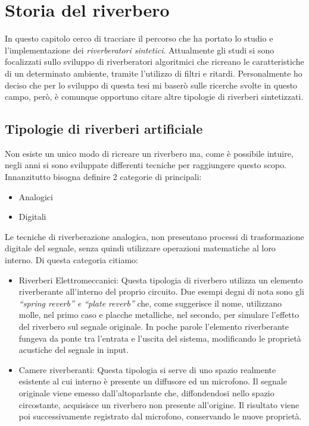 
\chapter{Storia del riverbero}
\label{chp:Storia del riverbero}

In questo capitolo cerco di tracciare il percorso che ha portato lo studio e l’implementazione dei \textit{riverberatori sintetici}. Attualmente gli studi si sono focalizzati sullo sviluppo di riverberatori algoritmici che ricreano le caratteristiche di un determinato ambiente, tramite l’utilizzo di filtri e ritardi. Personalmente ho deciso che per lo sviluppo di questa tesi mi baserò sulle ricerche svolte in questo campo, però, è comunque opportuno citare altre tipologie di riverberi sintetizzati.

\section{Tipologie di riverberi artificiale}

Non esiste un unico modo di ricreare un riverbero ma, come è possibile intuire, negli anni si sono sviluppate differenti tecniche per raggiungere questo scopo.
Innanzitutto bisogna definire 2 categorie di principali:

\begin{itemize}
\item Analogici
\item Digitali
\end{itemize}

Le tecniche di riverberazione analogica, non presentano processi di trasformazione digitale del segnale, senza quindi utilizzare operazioni matematiche al loro interno.
Di questa categoria citiamo:

\begin{itemize}
\item Riverberi Elettromeccanici: Questa tipologia di riverbero utilizza un elemento riverberante all’interno del proprio circuito. Due esempi degni di nota sono gli \emph{“spring reverb” e “plate reverb”} che, come suggerisce il nome, utilizzano molle, nel primo caso e placche metalliche, nel secondo, per simulare l’effetto del riverbero sul segnale originale. In poche parole l’elemento riverberante fungeva da ponte tra l’entrata e l’uscita del sistema, modificando le proprietà acustiche del segnale in input.
\item Camere riverberanti: Questa tipologia si serve di uno spazio realmente esistente al cui interno è presente un diffusore ed un microfono. Il segnale originale viene emesso dall’altoparlante che, diffondendosi nello spazio circostante, acquisisce un riverbero non presente all’origine. Il risultato viene poi successivamente registrato dal microfono, conservando le nuove proprietà. 
\end{itemize}


